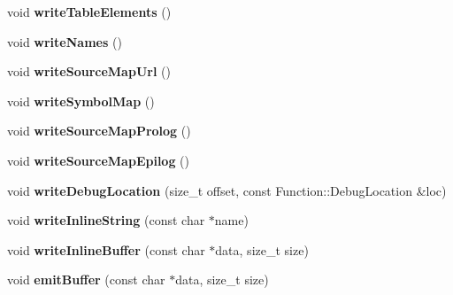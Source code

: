 \begin{DoxyCompactItemize}
void {\bfseries write\+Table\+Elements} ()
\item 
\mbox{\label{classwasm_1_1_wasm_binary_writer_ae3bb6c2f3b025ad83d66100763d7e301}} 
void {\bfseries write\+Names} ()
\item 
\mbox{\label{classwasm_1_1_wasm_binary_writer_ab5099a932a225881c0c7afa6470899d0}} 
void {\bfseries write\+Source\+Map\+Url} ()
\item 
\mbox{\label{classwasm_1_1_wasm_binary_writer_a50a19310ee79cdf2b4f861d8b6e1c601}} 
void {\bfseries write\+Symbol\+Map} ()
\item 
\mbox{\label{classwasm_1_1_wasm_binary_writer_a4ebfa7f13f5cf0ee0ef80a4ac98559c1}} 
void {\bfseries write\+Source\+Map\+Prolog} ()
\item 
\mbox{\label{classwasm_1_1_wasm_binary_writer_a32f4acbf892675c5341779d36532c212}} 
void {\bfseries write\+Source\+Map\+Epilog} ()
\item 
\mbox{\label{classwasm_1_1_wasm_binary_writer_a818d3d7b2ca42cc1e1151bc69719f8b2}} 
void {\bfseries write\+Debug\+Location} (size\+\_\+t offset, const Function\+::\+Debug\+Location \&loc)
\item 
\mbox{\label{classwasm_1_1_wasm_binary_writer_a7e2548c3ea66b8224ed65bec9d31abbf}} 
void {\bfseries write\+Inline\+String} (const char $\ast$name)
\item 
\mbox{\label{classwasm_1_1_wasm_binary_writer_a877d33d07f93ed22d70dddd5b172ca47}} 
void {\bfseries write\+Inline\+Buffer} (const char $\ast$data, size\+\_\+t size)
\item 
\mbox{\label{classwasm_1_1_wasm_binary_writer_ac1c3f5aa9949bf345e1804401f10d132}} 
void {\bfseries emit\+Buffer} (const char $\ast$data, size\+\_\+t size)
\item 
\mbox{\label{classwasm_1_1_wasm_binary_writer_a9e25ab11a0506e39c9604c75828b47c7}} 

\end{DoxyCompactItemize}
